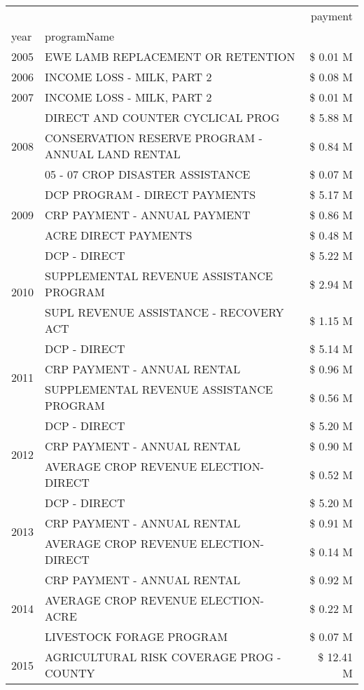 \begin{tabular}{llr}
\toprule
 &  & payment \\
year & programName &  \\
\midrule
2005 & EWE LAMB REPLACEMENT OR RETENTION & \$ 0.01 M \\
\cline{1-3}
2006 & INCOME LOSS - MILK, PART 2 & \$ 0.08 M \\
\cline{1-3}
2007 & INCOME LOSS - MILK, PART 2 & \$ 0.01 M \\
\cline{1-3}
\multirow[t]{3}{*}{2008} & DIRECT AND COUNTER CYCLICAL PROG & \$ 5.88 M \\
 & CONSERVATION RESERVE PROGRAM - ANNUAL LAND RENTAL & \$ 0.84 M \\
 & 05 - 07 CROP DISASTER ASSISTANCE & \$ 0.07 M \\
\cline{1-3}
\multirow[t]{3}{*}{2009} & DCP PROGRAM - DIRECT PAYMENTS & \$ 5.17 M \\
 & CRP PAYMENT - ANNUAL PAYMENT & \$ 0.86 M \\
 & ACRE DIRECT PAYMENTS & \$ 0.48 M \\
\cline{1-3}
\multirow[t]{3}{*}{2010} & DCP - DIRECT & \$ 5.22 M \\
 & SUPPLEMENTAL REVENUE ASSISTANCE PROGRAM & \$ 2.94 M \\
 & SUPL REVENUE ASSISTANCE - RECOVERY ACT & \$ 1.15 M \\
\cline{1-3}
\multirow[t]{3}{*}{2011} & DCP - DIRECT & \$ 5.14 M \\
 & CRP PAYMENT - ANNUAL RENTAL & \$ 0.96 M \\
 & SUPPLEMENTAL REVENUE ASSISTANCE PROGRAM & \$ 0.56 M \\
\cline{1-3}
\multirow[t]{3}{*}{2012} & DCP - DIRECT & \$ 5.20 M \\
 & CRP PAYMENT - ANNUAL RENTAL & \$ 0.90 M \\
 & AVERAGE CROP REVENUE ELECTION-DIRECT & \$ 0.52 M \\
\cline{1-3}
\multirow[t]{3}{*}{2013} & DCP - DIRECT & \$ 5.20 M \\
 & CRP PAYMENT - ANNUAL RENTAL & \$ 0.91 M \\
 & AVERAGE CROP REVENUE ELECTION-DIRECT & \$ 0.14 M \\
\cline{1-3}
\multirow[t]{3}{*}{2014} & CRP PAYMENT - ANNUAL RENTAL & \$ 0.92 M \\
 & AVERAGE CROP REVENUE ELECTION-ACRE & \$ 0.22 M \\
 & LIVESTOCK FORAGE PROGRAM & \$ 0.07 M \\
\cline{1-3}
\multirow[t]{3}{*}{2015} & AGRICULTURAL RISK COVERAGE PROG - COUNTY & \$ 12.41 M \\

\end{tabular}
